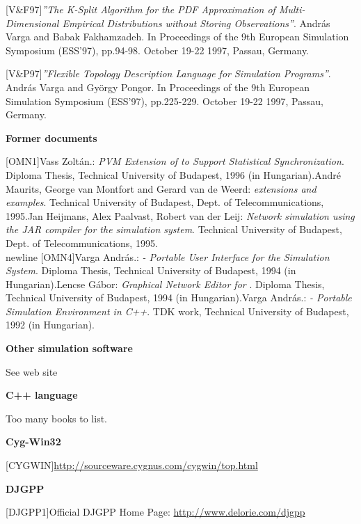 [V\&F97]\tab \textit{''The K-Split Algorithm for the PDF Approximation 
of Multi-Dimensional Empirical Distributions without Storing 
Observations''}. Andr\'{a}s Varga and Babak Fakhamzadeh. In 
Proceedings of the 9th European Simulation Symposium (ESS'97), 
pp.94-98. October 19-22 1997, Passau, Germany.


[V\&P97]\tab \textit{''Flexible Topology Description Language for 
Simulation Programs''}. Andr\'{a}s Varga and Gy\"{o}rgy Pongor. 
In Proceedings of the 9th European Simulation Symposium (ESS'97), 
pp.225-229. October 19-22 1997, Passau, Germany.


\textbf{Former {\opp} documents}


[OMN1]\tab Vass Zolt\'{a}n.: \textit{PVM Extension of {\opp} to Support 
Statistical Synchronization}. Diploma Thesis, Technical University 
of Budapest, 1996 (in Hungarian).\newline
[OMN2]\tab Andr\'{e} Maurits, George van Montfort and Gerard van de 
Weerd: \textit{{\opp} extensions and examples}. Technical University 
of Budapest, Dept. of Telecommunications, 1995.\newline
[OMN3]\tab Jan Heijmans, Alex Paalvast, Robert van der Leij: \textit{Network 
simulation using the JAR compiler for the {\opp} simulation 
system}. Technical University of Budapest, Dept. of Telecommunications, 
1995.\\newline
[OMN4]\tab Varga Andr\'{a}s.: \textit{{\opp} - Portable User Interface 
for the {\opp} Simulation System}. Diploma Thesis, Technical 
University of Budapest, 1994 (in Hungarian).\newline
[OMN5]\tab Lencse G\'{a}bor: \textit{Graphical Network Editor for {\opp}}. 
Diploma Thesis, Technical University of Budapest, 1994 (in Hungarian).\newline
[OMN6]\tab Varga Andr\'{a}s.: \textit{{\opp} - Portable Simulation Environment 
in C++}. TDK work, Technical University of Budapest, 1992 (in 
Hungarian).


\textbf{Other simulation software}


See web site


\textbf{C++ language}


Too many books to list.


\textbf{Cyg-Win32}


[CYGWIN]\tab \href{http://sourceware.cygnus.com/cygwin/top.html}{http://sourceware.cygnus.com/cygwin/top.html}


\textbf{DJGPP}


[DJGPP1]\tab Official DJGPP Home Page: \href{http://www.delorie.com/djgpp}{http://www.delorie.com/djgpp}


